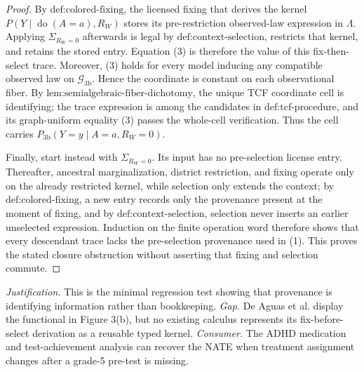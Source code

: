\documentclass{article}
\begin{document}
\begin{proof}
By \(\text{def:colored-fixing}\), the licensed fixing that derives the kernel \(P(Y\mid\operatorname{do}(A=a),R_W)\) stores its pre-restriction observed-law expression in \(\Lambda\).  Applying \(\Sigma_{R_W=0}\) afterwards is legal by \(\text{def:context-selection}\), restricts that kernel, and retains the stored entry.  Equation (3) is therefore the value of this fix-then-select trace.  Moreover, (3) holds for every model inducing any compatible observed law on \(\mathcal G_{\mathrm{3b}}\).  Hence the coordinate is constant on each observational fiber.  By \(\text{lem:semialgebraic-fiber-dichotomy}\), the unique TCF coordinate cell is identifying; the trace expression is among the candidates in \(\text{def:tcf-procedure}\), and its graph-uniform equality (3) passes the whole-cell verification.  Thus the cell carries \(P_{\mathrm{3b}}(Y=y\mid A=a,R_W=0)\).

Finally, start instead with \(\Sigma_{R_W=0}\).  Its input has no pre-selection license entry.  Thereafter, ancestral marginalization, district restriction, and fixing operate only on the already restricted kernel, while selection only extends the context; by \(\text{def:colored-fixing}\), a new entry records only the provenance present at the moment of fixing, and by \(\text{def:context-selection}\), selection never inserts an earlier unselected expression.  Induction on the finite operation word therefore shows that every descendant trace lacks the pre-selection provenance used in (1).  This proves the stated closure obstruction without asserting that fixing and selection commute.
\end{proof}
\par\smallskip\noindent \textit{Justification.} This is the minimal regression test showing that provenance is identifying information rather than bookkeeping. \textit{Gap.} De Aguas et al. display the functional in Figure 3(b), but no existing calculus represents its fix-before-select derivation as a reusable typed kernel. \textit{Consumer.} The ADHD medication and test-achievement analysis can recover the NATE when treatment assignment changes after a grade-5 pre-test is missing.
\end{document}
